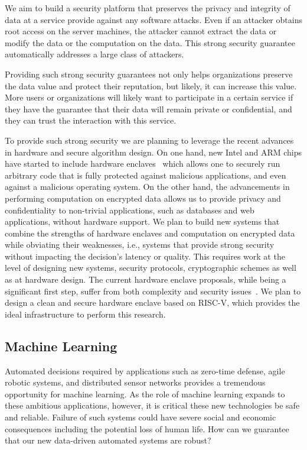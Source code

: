 We aim to build a security platform that preserves the privacy and integrity of data at a service provide against any software attacks. Even if an attacker obtains root access on the server machines, the attacker cannot extract the data or modify the data or the computation on the data. This strong security guarantee automatically addresses a large class of attackers.

Providing such strong security guarantees not only helps organizations preserve the data value and protect their reputation, but likely, it can increase this value. More users or organizations will likely want to participate in a certain service if they have the guarantee that their data will remain private or confidential, and they can trust the interaction with this service.
                                               
To provide such strong security we are planning to leverage the recent advances in hardware and secure algorithm design. On one hand, new Intel and ARM chips have started to include hardware enclaves~\cite{IntelSGX} which allows one to securely run arbitrary code that is fully protected against malicious applications, and even against a malicious operating system.  On the other hand, the advancements in performing computation on encrypted data allows us to provide privacy and confidentiality to non-trivial applications, such as databases and web applications, without hardware support. 
We plan to build new systems that combine the strengths of hardware enclaves and computation  on encrypted data while obviating their weaknesses, i.e., systems that provide strong security without impacting the decision's latency or quality. This requires work at the level of designing new systems, security protocols, cryptographic schemes as well as at hardware design. The current hardware enclave proposals, while being a significant first step, suffer from both complexity and security issues~\cite{SGXcostandevadas}. We plan to design a clean and secure hardware enclave based on RISC-V, which provides the ideal infrastructure to perform this research. 


\subsection{Machine Learning} 

Automated decisions required by applications such as zero-time defense, agile robotic systems, and distributed sensor networks provides a tremendous opportunity for machine learning. As the role of machine learning expands to these ambitious applications, however, it is critical these new technologies be safe and reliable.  Failure of such systems could have severe social and economic consequences including the potential loss of human life. How can we guarantee that our new data-driven automated systems are robust?

